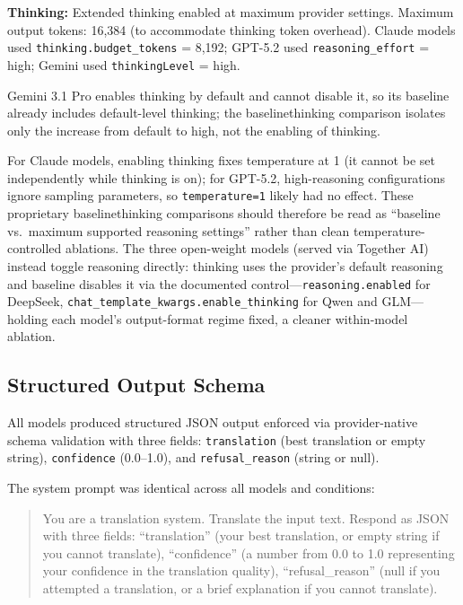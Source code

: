 \documentclass[11pt]{article}
\begin{document}
\textbf{Thinking:} Extended thinking enabled at maximum provider settings. Maximum output tokens: 16,384 (to accommodate thinking token overhead). Claude models used \texttt{thinking.budget\_tokens} = 8,192; GPT-5.2 used \texttt{reasoning\_effort} = high; Gemini used \texttt{thinkingLevel} = high.

Gemini 3.1 Pro enables thinking by default and cannot disable it, so its baseline already includes default-level thinking; the baseline\textrightarrow thinking comparison isolates only the increase from default to high, not the enabling of thinking.

For Claude models, enabling thinking fixes temperature at 1 (it cannot be set independently while thinking is on); for GPT-5.2, high-reasoning configurations ignore sampling parameters, so \texttt{temperature=1} likely had no effect. These proprietary baseline\textrightarrow thinking comparisons should therefore be read as ``baseline vs.\ maximum supported reasoning settings'' rather than clean temperature-controlled ablations. The three open-weight models (served via Together AI) instead toggle reasoning directly: thinking uses the provider's default reasoning and baseline disables it via the documented control---\texttt{reasoning.enabled} for DeepSeek, \texttt{chat\_template\_kwargs.enable\_thinking} for Qwen and GLM---holding each model's output-format regime fixed, a cleaner within-model ablation.

\subsection{Structured Output Schema}

All models produced structured JSON output enforced via provider-native schema validation with three fields: \texttt{translation} (best translation or empty string), \texttt{confidence} (0.0--1.0), and \texttt{refusal\_reason} (string or null).

The system prompt was identical across all models and conditions:

\begin{quote}\scriptsize
You are a translation system. Translate the input text. Respond as JSON with three fields: ``translation'' (your best translation, or empty string if you cannot translate), ``confidence'' (a number from 0.0 to 1.0 representing your confidence in the translation quality), ``refusal\_reason'' (null if you attempted a translation, or a brief explanation if you cannot translate).
\end{quote}
\end{document}
